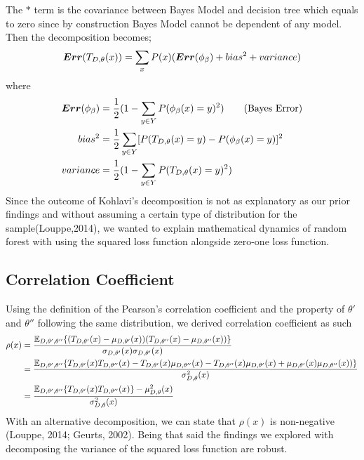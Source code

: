 The $*$ term is the covariance between Bayes Model and decision tree which equals to zero since by construction Bayes Model cannot be dependent of any model. Then the decomposition becomes;
\begin{align}
\boldsymbol{Err}(T_{D, \theta}(x)) = \sum_{x} P(x)(\boldsymbol{Err}(\phi_{\beta}) + bias^2 + variance) \notag
\end{align}
where
\begin{align}
\boldsymbol{Err}(\phi_{\beta}) & = \dfrac{1}{2}(1 - \sum_{y \in Y}P(\phi_{\beta}(x) = y)^2)\tag{Bayes Error} \\
bias^2 & = \dfrac{1}{2}\sum_{y \in Y} [P(T_{D,\theta}(x)=y) - P(\phi_{\beta}(x) = y)]^2\notag \\
variance & = \dfrac{1}{2}(1 - \sum_{y \in Y}P(T_{D, \theta}(x) = y)^2) \notag
\end{align}
Since the outcome of Kohlavi's decomposition is not as explanatory as our prior findings and without assuming a certain type of distribution for the sample(Louppe,2014), we wanted to explain mathematical dynamics of random forest with using the squared loss function alongside zero-one loss function.

\subsection{Correlation Coefficient}
Using the definition of the Pearson's correlation coefficient and the property of $\theta'$ and $\theta''$ following the same distribution, we derived correlation coefficient as such
\begin{align}
\rho(x) & = \dfrac{\mathbb{E}_{D,\theta',\theta''}\{(T_{D,\theta'}(x) - \mu_{D,\theta'}(x))(T_{D,\theta''}(x) - \mu_{D,\theta''}(x))\} }				{\sigma_{D,\theta'}(x)\sigma_{D,\theta'}(x)}\notag \\
		& = \dfrac{\mathbb{E}_{D,\theta',\theta''}\{T_{D,\theta'}(x)T_{D,\theta''}(x) - T_{D,\theta'}(x)\mu_{D,\theta''}(x) - T_{D,								\theta''}(x)\mu_{D,\theta'}(x) + \mu_{D,\theta'}(x)\mu_{D,\theta''}(x))\} }
				{\sigma_{D,\theta}^2(x)} \notag \\
		& = \dfrac{\mathbb{E}_{D,\theta',\theta''}\{T_{D,\theta'}(x) T_{D,\theta''}(x)\} - \mu_{D,\theta}^2(x)}{\sigma_{D,\theta}^2(x)}\notag
\end{align}
With an alternative decomposition, we can state that $\rho(x)$ is non-negative (Louppe, 2014; Geurts, 2002). Being that said the findings we explored with decomposing the variance of the squared loss function are robust.

